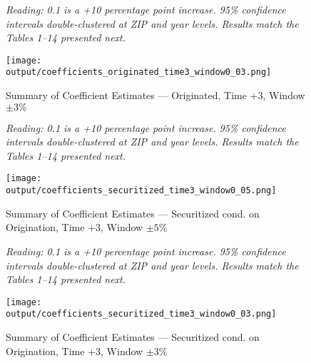 \documentclass{article}
\begin{document}
\clearpage
\pagebreak

\begin{figure}
    
    \caption{Summary of Coefficient Estimates --- Originated, Time +3, Window $\pm 3\%$}

    \emph{Reading: 0.1 is a +10 percentage point increase. 95\% confidence intervals double-clustered at ZIP and year levels. Results match the Tables 1--14 presented next.}

    \begin{center}
        \texttt{[image: output/coefficients\_originated\_time3\_window0\_03.png]}
    \end{center}
    
\end{figure}
    
\clearpage
\pagebreak

\begin{figure}
    
    \caption{Summary of Coefficient Estimates --- Securitized cond. on Origination, Time +3, Window $\pm 5\%$}

    \emph{Reading: 0.1 is a +10 percentage point increase. 95\% confidence intervals double-clustered at ZIP and year levels. Results match the Tables 1--14 presented next.}

    \begin{center}
        \texttt{[image: output/coefficients\_securitized\_time3\_window0\_05.png]}
    \end{center}
    
\end{figure}
    
\clearpage
\pagebreak

\begin{figure}
    
    \caption{Summary of Coefficient Estimates --- Securitized cond. on Origination, Time +3, Window $\pm 3\%$}

    \emph{Reading: 0.1 is a +10 percentage point increase. 95\% confidence intervals double-clustered at ZIP and year levels. Results match the Tables 1--14 presented next.}

    \begin{center}
        \texttt{[image: output/coefficients\_securitized\_time3\_window0\_03.png]}
    \end{center}
    
\end{figure}
    
\clearpage
\pagebreak
\end{document}
